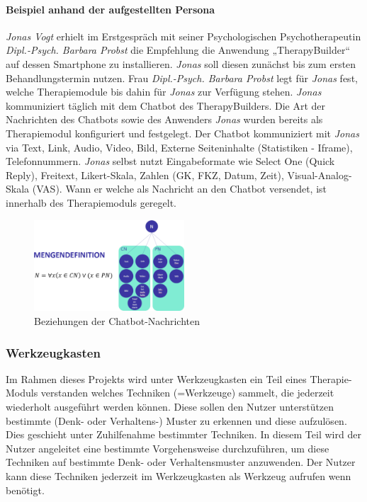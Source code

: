 \paragraph{Beispiel anhand der aufgestellten Persona}
\emph{Jonas Vogt} erhielt im Erstgespräch mit seiner Psychologischen Psychotherapeutin \emph{Dipl.-Psych. Barbara Probst} die Empfehlung die Anwendung „TherapyBuilder“ auf dessen Smartphone zu installieren. \emph{Jonas} soll diesen zunächst bis zum ersten Behandlungstermin nutzen. Frau \emph{Dipl.-Psych. Barbara Probst} legt für \emph{Jonas} fest, welche Therapiemodule bis dahin für \emph{Jonas} zur Verfügung stehen. \emph{Jonas} kommuniziert täglich mit dem Chatbot des TherapyBuilders. Die Art der Nachrichten des Chatbots sowie des Anwenders \emph{Jonas} wurden bereits als Therapiemodul konfiguriert und festgelegt. Der Chatbot kommuniziert mit \emph{Jonas} via Text, Link, Audio, Video, Bild, Externe Seiteninhalte (Statistiken - Iframe), Telefonnummern. \emph{Jonas} selbst nutzt Eingabeformate wie Select One (Quick Reply), Freitext, Likert-Skala, Zahlen (GK, FKZ, Datum, Zeit), Visual-Analog-Skala (VAS). Wann er welche als Nachricht an den Chatbot versendet, ist innerhalb des Therapiemoduls geregelt.

\begin{figure}[h]
\centering
\includegraphics[width=0.5\textwidth]{pictures/nachrichtdef}
\caption{Beziehungen der Chatbot-Nachrichten}
\label{therapiedef}
\end{figure}

\subsubsection{Werkzeugkasten}
Im Rahmen dieses Projekts wird unter Werkzeugkasten ein Teil eines Therapie-Moduls verstanden welches Techniken (=Werkzeuge) sammelt, die jederzeit wiederholt ausgeführt werden können. Diese sollen den Nutzer unterstützen bestimmte (Denk- oder Verhaltens-) Muster zu erkennen und diese aufzulösen. Dies geschieht unter Zuhilfenahme bestimmter Techniken. In diesem Teil wird der Nutzer angeleitet eine bestimmte Vorgehensweise durchzuführen, um diese Techniken auf bestimmte Denk- oder Verhaltensmuster anzuwenden. Der Nutzer kann diese Techniken jederzeit im Werkzeugkasten als Werkzeug aufrufen wenn benötigt.

